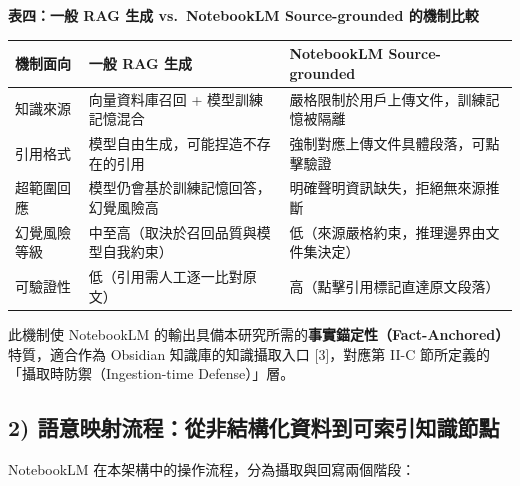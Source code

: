 \textbf{表四：一般 RAG 生成 vs.~NotebookLM Source-grounded 的機制比較}

{\def\LTcaptype{none} %
\begin{longtable}[]{@{}
  >{\raggedright\arraybackslash}p{}
  >{\raggedright\arraybackslash}p{}
  >{\raggedright\arraybackslash}p{}@{}}
\toprule\noalign{}
\begin{minipage}[b]{\linewidth}\raggedright
機制面向
\end{minipage} & \begin{minipage}[b]{\linewidth}\raggedright
一般 RAG 生成
\end{minipage} & \begin{minipage}[b]{\linewidth}\raggedright
NotebookLM Source-grounded
\end{minipage} \\
\midrule\noalign{}
\endhead
\bottomrule\noalign{}
\endlastfoot
知識來源 & 向量資料庫召回 + 模型訓練記憶混合 &
嚴格限制於用戶上傳文件，訓練記憶被隔離 \\
引用格式 & 模型自由生成，可能捏造不存在的引用 &
強制對應上傳文件具體段落，可點擊驗證 \\
超範圍回應 & 模型仍會基於訓練記憶回答，幻覺風險高 &
明確聲明資訊缺失，拒絕無來源推斷 \\
幻覺風險等級 & 中至高（取決於召回品質與模型自我約束） &
低（來源嚴格約束，推理邊界由文件集決定） \\
可驗證性 & 低（引用需人工逐一比對原文） &
高（點擊引用標記直達原文段落） \\
\end{longtable}
}

此機制使 NotebookLM
的輸出具備本研究所需的\textbf{事實錨定性（Fact-Anchored）}特質，適合作為
Obsidian 知識庫的知識攝取入口 {[}3{]}，對應第 II-C
節所定義的「攝取時防禦（Ingestion-time Defense）」層。

\subsection{2)
語意映射流程：從非結構化資料到可索引知識節點}\label{ux8a9eux610fux6620ux5c04ux6d41ux7a0bux5f9eux975eux7d50ux69cbux5316ux8cc7ux6599ux5230ux53efux7d22ux5f15ux77e5ux8b58ux7bc0ux9ede}

NotebookLM 在本架構中的操作流程，分為攝取與回寫兩個階段：

